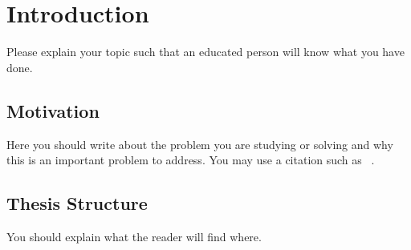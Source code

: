 \chapter{Introduction} 
\label{chap:introduction}

Please explain your topic such that an educated person will know what
you have done.


\section{Motivation}
\label{sec:motivation}

Here you should write about the problem you are studying or solving
and why this is an important problem to address. You may use a
citation such as~\cite{Guenes+:2008TR} \label{example:reference}. 



\section{Thesis Structure}
\label{sec:structure}

You should explain what the reader will find where.


